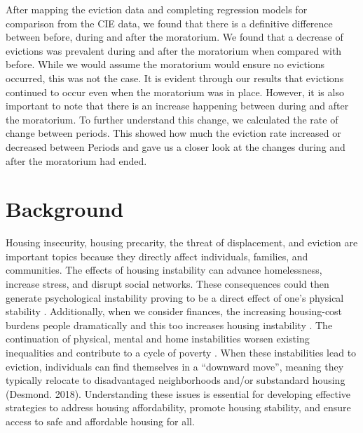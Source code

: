 \documentclass[man, 12pt, donotrepeattitle, floatsintext]{apa7} %
\begin{document}
After mapping the eviction data and completing regression models for comparison from the CIE data, we found that there is a definitive difference between before, during and after the moratorium. We found that a decrease of evictions was prevalent during and after the moratorium when compared with before. While we would assume the moratorium would ensure no evictions occurred, this was not the case. It is evident through our results that evictions continued to occur even when the moratorium was in place. However, it is also important to note that there is an increase happening between during and after the moratorium. To further understand this change, we calculated the rate of change between periods. This showed how much the eviction rate increased or decreased between Periods and gave us a closer look at the changes during and after the moratorium had ended. 


\section{Background}


Housing insecurity, housing precarity, the threat of displacement, and eviction are important topics because they directly affect individuals, families, and communities. The effects of housing instability can advance homelessness, increase stress, and disrupt social networks. These consequences could then generate psychological instability proving to be a direct effect of one's physical stability \parencite{DesmondKimbra2015EFHH}. Additionally, when we consider finances, the increasing housing-cost burdens people dramatically and this too increases housing instability \parencite{KangSeungbeom2019WLHB}. The continuation of physical, mental and home instabilities worsen existing inequalities and contribute to a cycle of poverty \parencite{DesmondKimbra2015EFHH}. When these instabilities lead to eviction, individuals can find themselves in a “downward move”, meaning they typically relocate to disadvantaged neighborhoods and/or substandard housing (Desmond. 2018). Understanding these issues is essential for developing effective strategies to address housing affordability, promote housing stability, and ensure access to safe and affordable housing for all.
\end{document}
